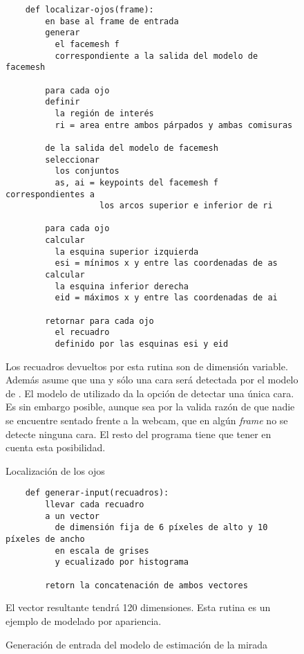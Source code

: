   \begin{figure}
    \centering
    \begin{verbatim}
    def localizar-ojos(frame):
        en base al frame de entrada
        generar
          el facemesh f
          correspondiente a la salida del modelo de facemesh

        para cada ojo
        definir
          la región de interés
          ri = area entre ambos párpados y ambas comisuras
        
        de la salida del modelo de facemesh
        seleccionar
          los conjuntos
          as, ai = keypoints del facemesh f correspondientes a
                   los arcos superior e inferior de ri
        
        para cada ojo
        calcular
          la esquina superior izquierda
          esi = mínimos x y entre las coordenadas de as
        calcular
          la esquina inferior derecha
          eid = máximos x y entre las coordenadas de ai
      
        retornar para cada ojo
          el recuadro
          definido por las esquinas esi y eid
    \end{verbatim}
    Los recuadros devueltos por esta rutina son de dimensión variable. \\
    Además asume que una y sólo una cara será detectada por el modelo de
    \facemesh.
    El modelo de \tfjs utilizado da la opción de detectar una única cara.
    Es sin embargo posible, aunque sea por la valida razón de que nadie se
    encuentre sentado frente a la webcam, que en algún \textit{frame} no se
    detecte ninguna cara.
    El resto del programa tiene que tener en cuenta esta posibilidad.
    \caption{Localización de los ojos}
    \label{fig:eyes-localization}
  \end{figure}

  \begin{figure}
    \begin{verbatim}
    def generar-input(recuadros):
        llevar cada recuadro
        a un vector
          de dimensión fija de 6 píxeles de alto y 10 píxeles de ancho
          en escala de grises
          y ecualizado por histograma

        retorn la concatenación de ambos vectores
    \end{verbatim}
    El vector resultante tendrá 120 dimensiones.
    Esta rutina es un ejemplo de modelado por apariencia.
    \caption{Generación de entrada del modelo de estimación de la mirada}
    \label{fig:eye-features-to-model-input}
  \end{figure}


